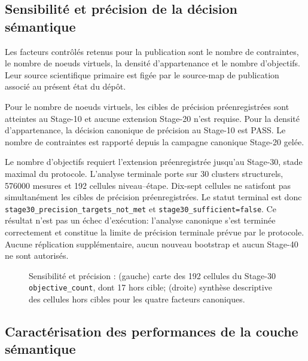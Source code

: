 \subsection{Sensibilité et précision de la décision sémantique}

Les facteurs contrôlés retenus pour la publication sont le nombre de
contraintes, le nombre de noeuds virtuels, la densité d'appartenance
et le nombre d'objectifs. Leur source scientifique primaire est
figée par le source-map de publication associé au présent état du
dépôt.

Pour le nombre de noeuds virtuels, les cibles de précision
préenregistrées sont atteintes au Stage-10 et aucune extension
Stage-20 n'est requise. Pour la densité d'appartenance, la décision
canonique de précision au Stage-10 est PASS. Le nombre de contraintes
est rapporté depuis la campagne canonique Stage-20 gelée.

Le nombre d'objectifs requiert l'extension préenregistrée jusqu'au
Stage-30, stade maximal du protocole. L'analyse terminale porte sur
30 clusters structurels, 576000 mesures et 192 cellules
niveau--étape. Dix-sept cellules ne satisfont pas simultanément les
cibles de précision préenregistrées. Le statut terminal est donc
\texttt{stage30\_precision\_targets\_not\_met} et
\texttt{stage30\_sufficient=false}. Ce résultat n'est pas un échec
d'exécution: l'analyse canonique s'est terminée correctement et
constitue la limite de précision terminale prévue par le protocole.
Aucune réplication supplémentaire, aucun nouveau bootstrap et aucun
Stage-40 ne sont autorisés.

\begin{figure}[!t]
\centering
\begin{minipage}[t]{0.49\textwidth}
\centering

\end{minipage}\hfill
\begin{minipage}[t]{0.49\textwidth}
\centering

\end{minipage}
\caption{Sensibilité et précision : (gauche) carte des 192 cellules du Stage-30 \texttt{objective\_count}, dont 17 hors cible; (droite) synthèse descriptive des cellules hors cibles pour les quatre facteurs canoniques.}
\label{fig:v4-sensitivity-terminal}
\end{figure}



\subsection{Caractérisation des performances de la couche sémantique}


